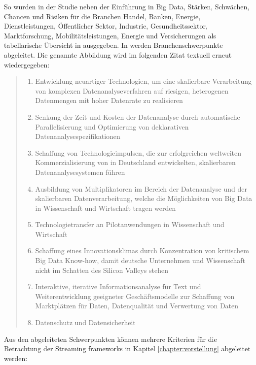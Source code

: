 So wurden in der Studie  neben der Einführung in Big Data, Stärken, Schwächen, Chancen und Risiken für die Branchen Handel, Banken, Energie, Dienstleistungen, Öffentlicher Sektor, Industrie, Gesundheitssektor, Marktforschung, Mobilitätsleistungen, Energie und Versicherungen als tabellarische Übersicht in  ausgegeben. In  werden Branchenschwerpunkte abgeleitet. Die genannte Abbildung wird im folgenden Zitat textuell erneut wiedergegeben:

\begin{quote}
	\begin{enumerate}
		\item Entwicklung neuartiger Technologien, um eine skalierbare Verarbeitung von komplexen Datenanalyseverfahren auf riesigen, heterogenen Datenmengen mit hoher Datenrate zu realisieren
		\item Senkung der Zeit und Kosten der Datenanalyse durch automatische Parallelisierung und Optimierung von deklarativen Datenanalysespezifikationen
		\item Schaffung von Technologieimpulsen, die zur erfolgreichen weltweiten Kommerzialisierung von in Deutschland entwickelten, skalierbaren Datenanalysesystemen führen
		\item Ausbildung von Multiplikatoren im Bereich der Datenanalyse und der skalierbaren Datenverarbeitung, welche die Möglichkeiten von Big Data in Wissenschaft und Wirtschaft tragen werden
		\item Technologietransfer an Pilotanwendungen in Wissenschaft und Wirtschaft
		\item Schaffung eines Innovationsklimas durch Konzentration von kritischem Big Data Know-how, damit deutsche Unternehmen und Wissenschaft nicht im Schatten des Silicon Valleys stehen
		\item Interaktive, iterative Informationsanalyse für Text und Weiterentwicklung geeigneter Geschäftsmodelle zur Schaffung von Marktplätzen für Daten, Datenqualität und Verwertung von Daten
		\item Datenschutz und Datensicherheit
	\end{enumerate}
\end{quote}

Aus den abgeleiteten Schwerpunkten können mehrere Kriterien für die Betrachtung der Streaming frameworks in Kapitel \ref{chapter:vorstellung} abgeleitet werden:

